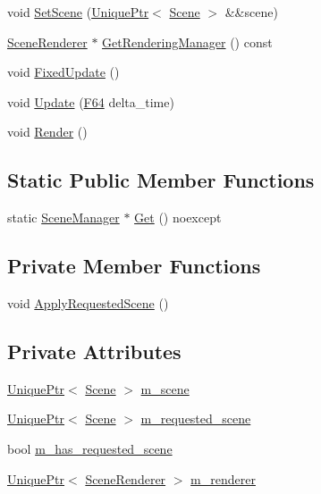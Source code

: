 \begin{DoxyCompactItemize}
void \hyperlink{classmage_1_1_scene_manager_abd9572b72caa412eda1f6c4e5d771fc3}{Set\+Scene} (\hyperlink{namespacemage_a3316d7143a973e37adf1110f2e80ca31}{Unique\+Ptr}$<$ \hyperlink{classmage_1_1_scene}{Scene} $>$ \&\&scene)
\item 
\hyperlink{classmage_1_1_scene_renderer}{Scene\+Renderer} $\ast$ \hyperlink{classmage_1_1_scene_manager_a0d2c95558b2217a490527038a668338c}{Get\+Rendering\+Manager} () const
\item 
void \hyperlink{classmage_1_1_scene_manager_a6d97c0fb7945aeb53ec950e62567c1f4}{Fixed\+Update} ()
\item 
void \hyperlink{classmage_1_1_scene_manager_a10c718ddfca8caa4bdc6f1cbf1daf12f}{Update} (\hyperlink{namespacemage_ad26233bbec640deda836e572c1a23708}{F64} delta\+\_\+time)
\item 
void \hyperlink{classmage_1_1_scene_manager_ac9ddb36bbd324bee8c702ea604633775}{Render} ()
\end{DoxyCompactItemize}
\subsection*{Static Public Member Functions}
\begin{DoxyCompactItemize}
\item 
static \hyperlink{classmage_1_1_scene_manager}{Scene\+Manager} $\ast$ \hyperlink{classmage_1_1_scene_manager_a282dbbea100d7de48c0b0876619db5e7}{Get} () noexcept
\end{DoxyCompactItemize}
\subsection*{Private Member Functions}
\begin{DoxyCompactItemize}
\item 
void \hyperlink{classmage_1_1_scene_manager_adadc65dc4bd9643c1befd261903309f7}{Apply\+Requested\+Scene} ()
\end{DoxyCompactItemize}
\subsection*{Private Attributes}
\begin{DoxyCompactItemize}
\item 
\hyperlink{namespacemage_a3316d7143a973e37adf1110f2e80ca31}{Unique\+Ptr}$<$ \hyperlink{classmage_1_1_scene}{Scene} $>$ \hyperlink{classmage_1_1_scene_manager_a774c610dba3ece25acf97915b6368a1a}{m\+\_\+scene}
\item 
\hyperlink{namespacemage_a3316d7143a973e37adf1110f2e80ca31}{Unique\+Ptr}$<$ \hyperlink{classmage_1_1_scene}{Scene} $>$ \hyperlink{classmage_1_1_scene_manager_a74bdb7b0805208b039991e9b9abc741f}{m\+\_\+requested\+\_\+scene}
\item 
bool \hyperlink{classmage_1_1_scene_manager_aff9889d9fc53a3524b0e88d10cd544d6}{m\+\_\+has\+\_\+requested\+\_\+scene}
\item 
\hyperlink{namespacemage_a3316d7143a973e37adf1110f2e80ca31}{Unique\+Ptr}$<$ \hyperlink{classmage_1_1_scene_renderer}{Scene\+Renderer} $>$ \hyperlink{classmage_1_1_scene_manager_ac50da0df383825fa3b4627cb42981498}{m\+\_\+renderer}
\end{DoxyCompactItemize}


